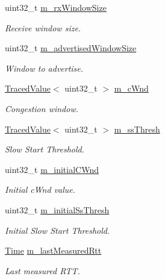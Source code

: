\begin{DoxyCompactItemize}
uint32\+\_\+t \hyperlink{classns3_1_1NscTcpSocketImpl_ab32850c3c3ab62f1616c8531c7431b14}{m\+\_\+rx\+Window\+Size}
\begin{DoxyCompactList}\small\item\em Receive window size. \end{DoxyCompactList}\item 
uint32\+\_\+t \hyperlink{classns3_1_1NscTcpSocketImpl_a186d532dcf757ca6406b310e55bb967c}{m\+\_\+advertised\+Window\+Size}
\begin{DoxyCompactList}\small\item\em Window to advertise. \end{DoxyCompactList}\item 
\hyperlink{classns3_1_1TracedValue}{Traced\+Value}$<$ uint32\+\_\+t $>$ \hyperlink{classns3_1_1NscTcpSocketImpl_a7e61e32de2c6d1e1296c2d78ba513fb2}{m\+\_\+c\+Wnd}
\begin{DoxyCompactList}\small\item\em Congestion window. \end{DoxyCompactList}\item 
\hyperlink{classns3_1_1TracedValue}{Traced\+Value}$<$ uint32\+\_\+t $>$ \hyperlink{classns3_1_1NscTcpSocketImpl_a361628ab449ed7b557e4191ba0bef7db}{m\+\_\+ss\+Thresh}
\begin{DoxyCompactList}\small\item\em Slow Start Threshold. \end{DoxyCompactList}\item 
uint32\+\_\+t \hyperlink{classns3_1_1NscTcpSocketImpl_adbbb7b9ef71615ae975409fe09bc9964}{m\+\_\+initial\+C\+Wnd}
\begin{DoxyCompactList}\small\item\em Initial c\+Wnd value. \end{DoxyCompactList}\item 
uint32\+\_\+t \hyperlink{classns3_1_1NscTcpSocketImpl_afb198c6a13c21763a9f3a0cc3a752fe8}{m\+\_\+initial\+Ss\+Thresh}
\begin{DoxyCompactList}\small\item\em Initial Slow Start Threshold. \end{DoxyCompactList}\item 
\hyperlink{classns3_1_1Time}{Time} \hyperlink{classns3_1_1NscTcpSocketImpl_a88657a9c20574a770943c06f4d68baa6}{m\+\_\+last\+Measured\+Rtt}
\begin{DoxyCompactList}\small\item\em Last measured R\+TT. \end{DoxyCompactList}\item 

\end{DoxyCompactItemize}
